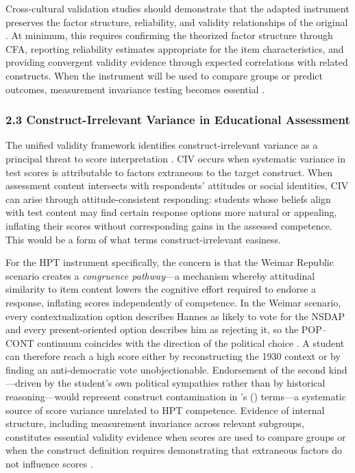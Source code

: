 \documentclass[
  12pt,
]{article}
\newcommand{\Loc}[1]{\linelabel{loc:#1}}
\newcommand{\LocEnd}[1]{\linelabel{loc:#1:end}}
\begin{document}
Cross-cultural validation studies should demonstrate that the adapted instrument preserves the factor structure, reliability, and validity relationships of the original \citep{Hambleton2005}. At minimum, this requires confirming the theorized factor structure through CFA, reporting reliability estimates appropriate for the item characteristics, and providing convergent validity evidence through expected correlations with related constructs. When the instrument will be used to compare groups or predict outcomes, measurement invariance testing becomes essential \citep{AERA2014Standards}.

\hypertarget{construct-irrelevant-variance-in-educational-assessment}{%
\subsubsection{2.3 Construct-Irrelevant Variance in Educational Assessment}\label{construct-irrelevant-variance-in-educational-assessment}}

The unified validity framework identifies construct-irrelevant variance as a principal threat to score interpretation \citep{AERA2014Standards,Messick1995Validity}. CIV occurs when systematic variance in test scores is attributable to factors extraneous to the target construct. When assessment content intersects with respondents' attitudes or social identities, CIV can arise through attitude-consistent responding: students whose beliefs align with test content may find certain response options more natural or appealing, inflating their scores without corresponding gains in the assessed competence. This would be a form of what \citet{Messick1995Validity} terms construct-irrelevant easiness.

For the HPT instrument specifically, the concern is that the Weimar Republic scenario creates a \emph{congruence pathway}---a mechanism whereby attitudinal similarity to item content lowers the cognitive effort required to endorse a response, inflating scores independently of competence. \Loc{s23-alignment}In the Weimar scenario, every contextualization option describes Hannes as likely to vote for the NSDAP and every present-oriented option describes him as rejecting it, so the POP--CONT continuum coincides with the direction of the political choice \citep{Wilschut_Schiphorst2019One}. A student can therefore reach a high score either by reconstructing the 1930 context or by finding an anti-democratic vote unobjectionable. Endorsement of the second kind---driven by the student's own political sympathies rather than by historical reasoning\LocEnd{s23-alignment}---would represent construct contamination in \citeauthor{Messick1995Validity}'s (\citeyear{Messick1995Validity}) terms---a systematic source of score variance unrelated to HPT competence. Evidence of internal structure, including measurement invariance across relevant subgroups, constitutes essential validity evidence when scores are used to compare groups or when the construct definition requires demonstrating that extraneous factors do not influence scores \citep{AERA2014Standards}.
\end{document}
